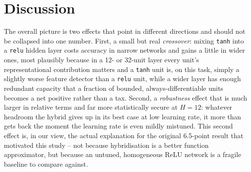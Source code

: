 \documentclass[9pt]{extarticle}
\begin{document}
\section{Discussion}
The overall picture is two effects that point in different directions and
should not be collapsed into one number. First, a small but real
\emph{crossover}: mixing \texttt{tanh} into a \texttt{relu} hidden layer
costs accuracy in narrow networks and gains a little in wider ones, most
plausibly because in a 12- or 32-unit layer every unit's representational
contribution matters and a \texttt{tanh} unit is, on this task, simply a
slightly worse feature detector than a \texttt{relu} unit, while a wider
layer has enough redundant capacity that a fraction of bounded,
always-differentiable units becomes a net positive rather than a tax. Second,
a \emph{robustness} effect that is much larger in relative terms and far more
statistically secure at \(H{=}12\): whatever headroom the hybrid gives up in
its best case at low learning rate, it more than gets back the moment the
learning rate is even mildly mistuned. This second effect is, in our view,
the actual explanation for the original 6.5-point result that motivated this
study -- not because hybridisation is a better function approximator, but
because an untuned, homogeneous ReLU network is a fragile baseline to compare
against.
\end{document}
